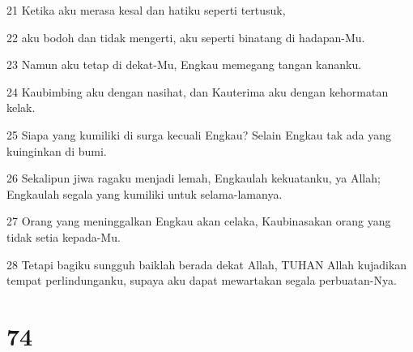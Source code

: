 \par 21 Ketika aku merasa kesal dan hatiku seperti tertusuk,
\par 22 aku bodoh dan tidak mengerti, aku seperti binatang di hadapan-Mu.
\par 23 Namun aku tetap di dekat-Mu, Engkau memegang tangan kananku.
\par 24 Kaubimbing aku dengan nasihat, dan Kauterima aku dengan kehormatan kelak.
\par 25 Siapa yang kumiliki di surga kecuali Engkau? Selain Engkau tak ada yang kuinginkan di bumi.
\par 26 Sekalipun jiwa ragaku menjadi lemah, Engkaulah kekuatanku, ya Allah; Engkaulah segala yang kumiliki untuk selama-lamanya.
\par 27 Orang yang meninggalkan Engkau akan celaka, Kaubinasakan orang yang tidak setia kepada-Mu.
\par 28 Tetapi bagiku sungguh baiklah berada dekat Allah, TUHAN Allah kujadikan tempat perlindunganku, supaya aku dapat mewartakan segala perbuatan-Nya.

\chapter{74}

